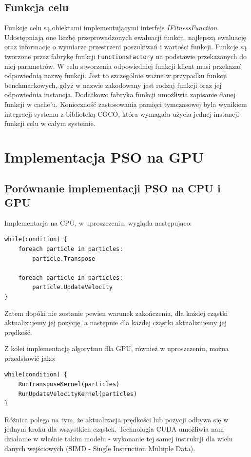 \documentclass[12pt, twoside, openany, abstract=on]{report}
\theoremstyle{definition}
\begin{document}
\subsection{Funkcja celu}
Funkcje celu są obiektami implementującymi interfejs \textit{IFitnessFunction}. Udostępniają one liczbę przeprowadzonych ewaluacji funkcji, najlepszą ewaluację oraz informacje o wymiarze przestrzeni poszukiwań i wartości funkcji. Funkcje są tworzone przez fabrykę funkcji \texttt{FunctionsFactory} na podstawie przekazanych do niej parametrów. W celu stworzenia odpowiedniej funkcji klient musi przekazać odpowiednią nazwę funkcji. Jest to szczególnie ważne w przypadku funkcji benchmarkowych, gdyż w nazwie zakodowany jest rodzaj funkcji oraz jej odpowiednia instancja. Dodatkowo fabryka funkcji umożliwia zapisanie danej funkcji w cache'u. Konieczność zastosowania pamięci tymczasowej była wynikiem integracji systemu z biblioteką COCO, która wymagała użycia jednej instancji funkcji celu w całym systemie.

\newpage

\section{Implementacja PSO na GPU}
\subsection{Porównanie implementacji PSO na CPU i GPU}
Implementacja na CPU, w uproszczeniu, wygląda następująco:
\begin{lstlisting}[frame=single]
while(condition) {
	foreach particle in particles:
		particle.Transpose

	foreach particle in particles:
		particle.UpdateVelocity
}
\end{lstlisting}

Zatem dopóki nie zostanie pewien warunek zakończenia, dla każdej cząstki aktualizujemy jej pozycję, a następnie dla każdej cząstki aktualizujemy jej prędkość.

Z kolei implementację algorytmu dla GPU, również w uproszczeniu, można przedstawić jako:

\begin{lstlisting}[frame=single]
while(condition) {
	RunTransposeKernel(particles)
	RunUpdateVelocityKernel(particles)
}
\end{lstlisting}

Różnica polega na tym, że aktualizacja prędkości lub pozycji odbywa się w jednym kroku dla wszystkich cząstek. Technologia CUDA umożliwia nam działanie w właśnie takim modelu - wykonanie tej samej instrukcji dla wielu danych wejściowych (SIMD - Single Instruction Multiple Data).
\end{document}

